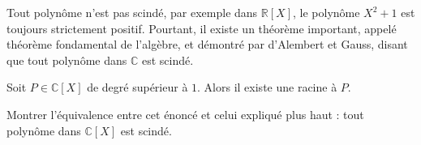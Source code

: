 Tout polynôme n'est pas scindé, par exemple dans $\mathbb R[X]$, le polynôme $X^2+1$ est toujours strictement positif. Pourtant, il existe un théorème important, appelé théorème fondamental de l'algèbre, et démontré par d'Alembert et Gauss, disant que tout polynôme dans $\mathbb C$ est scindé.

\begin{them}
    Soit $P\in\mathbb C[X]$ de degré supérieur à $1$. Alors il existe une racine à $P$.
\end{them}

\begin{exo}
    Montrer l'équivalence entre cet énoncé et celui expliqué plus haut : \og tout polynôme dans $\mathbb C[X]$ est scindé.\fg{}
\end{exo}

\newpage